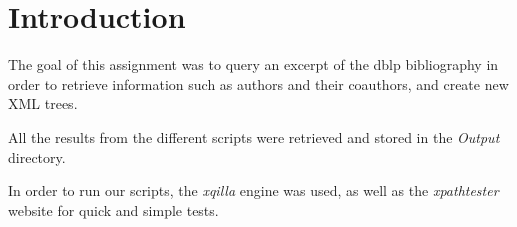 \section{Introduction}

The goal of this assignment was to query an excerpt of the dblp bibliography
in order to retrieve information such as authors and their coauthors, and
create new XML trees.\\

\begin{framehint}
    All the results from the different scripts were retrieved and stored in the
    \emph{Output} directory.
\end{framehint}

\begin{framehint}
    In order to run our scripts, the \emph{xqilla} \cite{cite:xqilla} engine was
    used, as well as the \emph{xpathtester} \cite{cite:xpathtester} website for
    quick and simple tests.
\end{framehint}

\newpage
